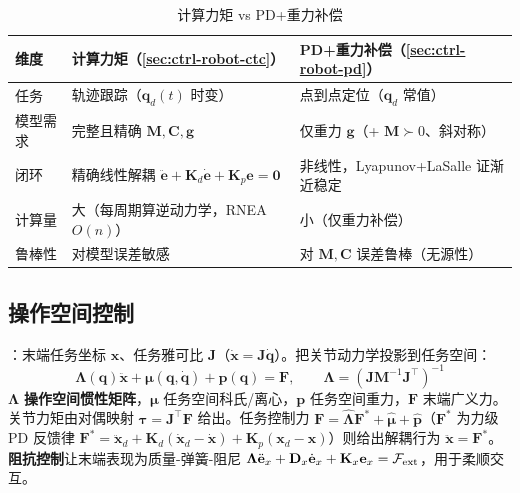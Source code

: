 \begin{table}[H]\centering\small
\caption{计算力矩 vs PD+重力补偿}
\label{tab:ctrl-ctc-vs-pd}
\begin{tabular}{p{} p{} p{}}
\toprule
维度 & 计算力矩（\cref{sec:ctrl-robot-ctc}） & PD+重力补偿（\cref{sec:ctrl-robot-pd}） \\
\midrule
任务 & 轨迹跟踪（$\mathbf{q}_d(t)$ 时变） & 点到点定位（$\mathbf{q}_d$ 常值） \\
模型需求 & 完整且精确 $\mathbf{M},\mathbf{C},\mathbf{g}$ & 仅重力 $\mathbf{g}$（+ $\mathbf{M}\succ0$、斜对称） \\
闭环 & 精确线性解耦 $\ddot{\mathbf{e}}+\mathbf{K}_d\dot{\mathbf{e}}+\mathbf{K}_p\mathbf{e}=\mathbf{0}$ & 非线性，Lyapunov+LaSalle 证渐近稳定 \\
计算量 & 大（每周期算逆动力学，RNEA $O(n)$） & 小（仅重力补偿） \\
鲁棒性 & 对模型误差敏感 & 对 $\mathbf{M},\mathbf{C}$ 误差鲁棒（无源性） \\
\bottomrule
\end{tabular}
\end{table}

\subsection{操作空间控制}
\label{sec:ctrl-robot-osc}

：末端任务坐标 $\mathbf{x}$、任务雅可比 $\mathbf{J}$（$\dot{\mathbf{x}}=\mathbf{J}\dot{\mathbf{q}}$）。把关节动力学投影到任务空间：
\begin{equation}
  \boldsymbol{\Lambda}(\mathbf{q})\ddot{\mathbf{x}}+\boldsymbol{\mu}(\mathbf{q},\dot{\mathbf{q}})+\mathbf{p}(\mathbf{q})=\mathbf{F},\qquad
  \boxed{\boldsymbol{\Lambda}=(\mathbf{J}\mathbf{M}^{-1}\mathbf{J}^\top)^{-1}}
  \label{eq:ctrl-osc}
\end{equation}
$\boldsymbol{\Lambda}$ \textbf{操作空间惯性矩阵}，$\boldsymbol{\mu}$ 任务空间科氏/离心，$\mathbf{p}$ 任务空间重力，$\mathbf{F}$ 末端广义力。关节力矩由对偶映射 $\boldsymbol{\tau}=\mathbf{J}^\top\mathbf{F}$ 给出。任务控制力 $\mathbf{F}=\hat{\boldsymbol{\Lambda}}\mathbf{F}^*+\hat{\boldsymbol{\mu}}+\hat{\mathbf{p}}$（$\mathbf{F}^*$ 为力级 PD 反馈律 $\mathbf{F}^*=\ddot{\mathbf{x}}_d+\mathbf{K}_d(\dot{\mathbf{x}}_d-\dot{\mathbf{x}})+\mathbf{K}_p(\mathbf{x}_d-\mathbf{x})$）则给出解耦行为 $\ddot{\mathbf{x}}=\mathbf{F}^*$。\textbf{阻抗控制}让末端表现为质量-弹簧-阻尼 $\boldsymbol{\Lambda}\ddot{\mathbf{e}}_x+\mathbf{D}_x\dot{\mathbf{e}}_x+\mathbf{K}_x\mathbf{e}_x=\mathcal{F}_{\rm ext}$，用于柔顺交互。

